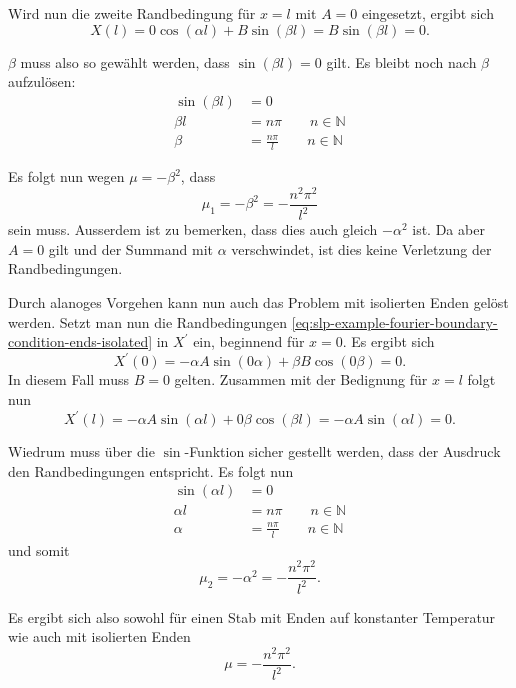 Wird nun die zweite Randbedingung für $x = l$ mit $A = 0$ eingesetzt, ergibt
sich
\[
    X(l)
    =
    0 \cos(\alpha l) + B \sin(\beta l)
    =
    B \sin(\beta l)
    = 0.
\]

$\beta$ muss also so gewählt werden, dass $\sin(\beta l) = 0$ gilt.
Es bleibt noch nach $\beta$ aufzulösen:
\[
\begin{aligned}
    \sin(\beta l) &= 0 \\
    \beta l &= n \pi \qquad n \in \mathbb{N} \\
    \beta &= \frac{n \pi}{l} \qquad n \in \mathbb{N}
\end{aligned}
\]

Es folgt nun wegen $\mu = -\beta^{2}$, dass
\[
    \mu_1 = -\beta^{2} = -\frac{n^{2}\pi^{2}}{l^{2}}
\]
sein muss.
Ausserdem ist zu bemerken, dass dies auch gleich $-\alpha^{2}$ ist.
Da aber $A = 0$ gilt und der Summand mit $\alpha$ verschwindet, ist dies keine
Verletzung der Randbedingungen.

Durch alanoges Vorgehen kann nun auch das Problem mit isolierten Enden gelöst
werden.
Setzt man nun die Randbedingungen
\eqref{eq:slp-example-fourier-boundary-condition-ends-isolated} in $X^{\prime}$
ein, beginnend für $x = 0$. Es ergibt sich
\[
    X^{\prime}(0)
    =
    -\alpha A \sin(0 \alpha) + \beta B \cos(0 \beta)
    = 0.
\]
In diesem Fall muss $B = 0$ gelten.
Zusammen mit der Bedignung für $x = l$
folgt nun
\[
    X^{\prime}(l)
    =
    - \alpha A \sin(\alpha l) + 0 \beta \cos(\beta l)
    =
    - \alpha A \sin(\alpha l)
    = 0.
\]

Wiedrum muss über die $ \sin $-Funktion sicher gestellt werden, dass der
Ausdruck den Randbedingungen entspricht.
Es folgt nun
\[
\begin{aligned}
    \sin(\alpha l) &= 0 \\
    \alpha l &= n \pi \qquad n \in \mathbb{N} \\
    \alpha &= \frac{n \pi}{l} \qquad n \in \mathbb{N}
\end{aligned}
\]
und somit
\[
    \mu_2 = -\alpha^{2} = -\frac{n^{2}\pi^{2}}{l^{2}}.
\]

Es ergibt sich also sowohl für einen Stab mit Enden auf konstanter Temperatur
wie auch mit isolierten Enden
\begin{equation}
    \label{eq:slp-example-fourier-mu-solution}
    \mu
    =
    -\frac{n^{2}\pi^{2}}{l^{2}}.
\end{equation}

%
%

